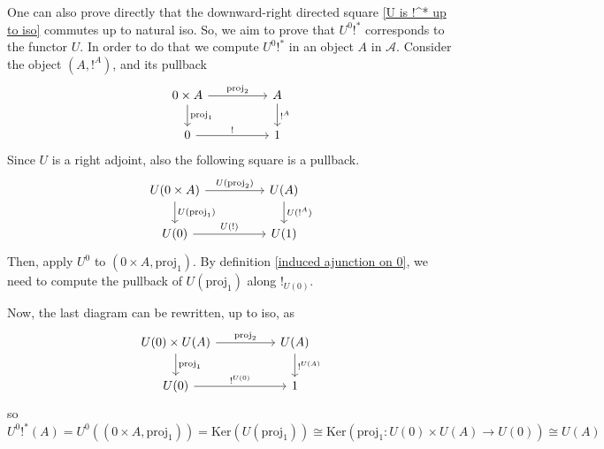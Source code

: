 \begin{rembox}{}
    \begin{rem}
        One can also prove directly that the downward-right directed square \eqref{U is !^* up to iso} commutes up to natural iso. So, we aim to prove that $U^0 !^*$ corresponds to the functor $U$. In order to do that we compute $U^0 !^*$ in an object $A$ in $\mathcal{A}$. Consider the object $(A,!^A)$, and its pullback
        \[
\begin{tikzcd}
0\times A \arrow[rr, "\mathrm{proj}_2"] \arrow[d, "\mathrm{proj}_1"] &  & A \arrow[d, "!^A"] \\
0 \arrow[rr, "!"]                                                     &  & 1                 
\end{tikzcd}
        \]
        Since $U$ is a right adjoint, also the following square is a pullback.
        \[
\begin{tikzcd}
U(0 \times A) \arrow[rr, "U(\mathrm{proj}_2)"] \arrow[d, "U(\mathrm{proj}_1)"] &  & U(A) \arrow[d, "U(!^A)"] \\
U(0) \arrow[rr, "U(!)"]                                                           &  & U(1)                    
\end{tikzcd}
\]
Then, apply $U^0$ to $(0\times A,\mathrm{proj}_1)$. By definition \eqref{induced ajunction on 0}, we need to compute the pullback of $U(\mathrm{proj}_1)$ along $!_{U(0)}$.

Now, the last diagram can be rewritten, up to iso, as
\[
\begin{tikzcd}
U(0) \times U(A) \arrow[rr, "\mathrm{proj}_2"] \arrow[d, "\mathrm{proj}_1"] &  & U(A) \arrow[d, "!^{U(A)}"] \\
U(0) \arrow[rr, "!^{U(0)}"]                                                     &  & 1                         
\end{tikzcd}
\]
so $U^0!^*(A) = U^0((0 \times A, \mathrm{proj}_1)) = \mathrm{Ker}(U(\mathrm{proj}_1)) \cong \mathrm{Ker}(\mathrm{proj}_1: U(0) \times U(A) \to U(0)) \cong U(A)$
\end{rem}
\end{rembox}

